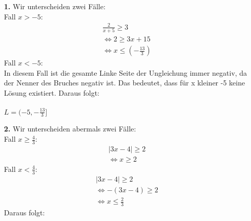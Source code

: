 \documentclass [a4paper,11pt]{article}
\author{\authorinfo}
\title{\titleinfo}
\date{\today}
\begin{document}
\maketitle
    \begin{enumerate}
        \item[\textbf{1.}]
            Wir unterscheiden zwei Fälle: \\
            Fall $x > -5$:\\
            \begin{align}
                \frac{2}{x+5} \geq 3 \\
                \Leftrightarrow 2 \geq 3x+15 \\
                \Leftrightarrow x \leq (- \frac{13}{3})
            \end{align}
            Fall $x < -5$:\\
                In diesem Fall ist die gesamte Linke Seite der Ungleichung immer negativ, da der Nenner des Bruches negativ ist. Das bedeutet, dass für x kleiner -5 keine Lösung existiert.
            Daraus folgt: \\ \\
            $L = (- 5, - \frac{13}{3}]$
        \item[\textbf{2.}]
            Wir unterscheiden abermals zwei Fälle: \\
            Fall $x \geq \frac{4}{3}$: \\
            \begin{align}
                |3x-4| \geq 2 \\
                \Leftrightarrow x \geq 2
            \end{align}
            Fall $x < \frac{4}{3}$: \\
            \begin{align}
                |3x-4| \geq 2 \\
                \Leftrightarrow -(3x-4) \geq 2 \\
                \Leftrightarrow x \leq \frac{2}{3}
            \end{align}
            Daraus folgt: \\ \\

\end{enumerate}
\end{document}
